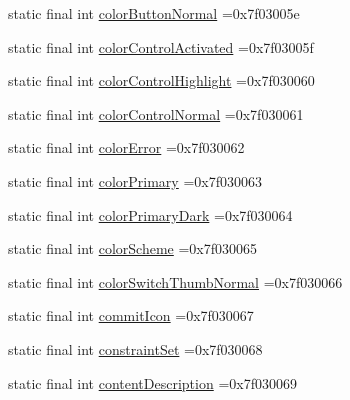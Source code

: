 \begin{DoxyCompactItemize}
\item 
static final int \mbox{\hyperlink{classbr_1_1unb_1_1cic_1_1mp_1_1marketmaster_1_1test_1_1R_1_1attr_a2e48cc15a4c2e58b32a559d33c833a6b}{color\+Button\+Normal}} =0x7f03005e
\item 
static final int \mbox{\hyperlink{classbr_1_1unb_1_1cic_1_1mp_1_1marketmaster_1_1test_1_1R_1_1attr_a924954e6a197c3871a4545e6c72e7efd}{color\+Control\+Activated}} =0x7f03005f
\item 
static final int \mbox{\hyperlink{classbr_1_1unb_1_1cic_1_1mp_1_1marketmaster_1_1test_1_1R_1_1attr_a81d03d5f78df27c7176ac42f52d7b10b}{color\+Control\+Highlight}} =0x7f030060
\item 
static final int \mbox{\hyperlink{classbr_1_1unb_1_1cic_1_1mp_1_1marketmaster_1_1test_1_1R_1_1attr_aa8f4b2afd3410a5e927bd9274080d3de}{color\+Control\+Normal}} =0x7f030061
\item 
static final int \mbox{\hyperlink{classbr_1_1unb_1_1cic_1_1mp_1_1marketmaster_1_1test_1_1R_1_1attr_ac264e1732dbaa4af8d2897d297a1b085}{color\+Error}} =0x7f030062
\item 
static final int \mbox{\hyperlink{classbr_1_1unb_1_1cic_1_1mp_1_1marketmaster_1_1test_1_1R_1_1attr_a5b5b64454e4e9230180a8a0b1291dbee}{color\+Primary}} =0x7f030063
\item 
static final int \mbox{\hyperlink{classbr_1_1unb_1_1cic_1_1mp_1_1marketmaster_1_1test_1_1R_1_1attr_a8ecada207d6fc5be2571287eac060cd0}{color\+Primary\+Dark}} =0x7f030064
\item 
static final int \mbox{\hyperlink{classbr_1_1unb_1_1cic_1_1mp_1_1marketmaster_1_1test_1_1R_1_1attr_a917da1f42f33bac58717823d1b268955}{color\+Scheme}} =0x7f030065
\item 
static final int \mbox{\hyperlink{classbr_1_1unb_1_1cic_1_1mp_1_1marketmaster_1_1test_1_1R_1_1attr_a50e0bf61ecf89a078d0573f1c0f0a3cf}{color\+Switch\+Thumb\+Normal}} =0x7f030066
\item 
static final int \mbox{\hyperlink{classbr_1_1unb_1_1cic_1_1mp_1_1marketmaster_1_1test_1_1R_1_1attr_ad64d282d20d22e5cf21fa7209c8f2a02}{commit\+Icon}} =0x7f030067
\item 
static final int \mbox{\hyperlink{classbr_1_1unb_1_1cic_1_1mp_1_1marketmaster_1_1test_1_1R_1_1attr_ad11a8933a3599c42dfe190e66bffb0f6}{constraint\+Set}} =0x7f030068
\item 
static final int \mbox{\hyperlink{classbr_1_1unb_1_1cic_1_1mp_1_1marketmaster_1_1test_1_1R_1_1attr_aa886f136b39d669159dda460162d9f19}{content\+Description}} =0x7f030069
\item 

\end{DoxyCompactItemize}
